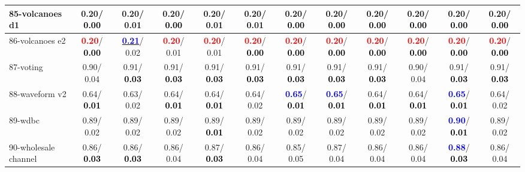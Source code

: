 \begin{table}[h]
\begin{center}
{\begin{tabular}{lc|c|c|c|c|c|c|c|c|c|c}
85-volcanoes d1 &   0.20/\textcolor{black}{\textbf{  0.00}} &   0.20/  0.01 &   0.20/\textcolor{black}{\textbf{  0.00}} &   0.20/  0.01 &   0.20/  0.01 &   0.20/\textcolor{black}{\textbf{  0.00}} &   0.20/\textcolor{black}{\textbf{  0.00}} &   0.20/\textcolor{black}{\textbf{  0.00}} &   0.20/\textcolor{black}{\textbf{  0.00}} &   0.20/\textcolor{black}{\textbf{  0.00}} &   0.20/\textcolor{black}{\textbf{  0.00}} \\ \hline
86-volcanoes e2 & \textcolor{red}{\textbf{  0.20}}/\textcolor{black}{\textbf{  0.00}} & \underline{\textcolor{blue}{\textbf{  0.21}}}/  0.02 & \textcolor{red}{\textbf{  0.20}}/  0.01 & \textcolor{red}{\textbf{  0.20}}/  0.01 & \textcolor{red}{\textbf{  0.20}}/\textcolor{black}{\textbf{  0.00}} & \textcolor{red}{\textbf{  0.20}}/\textcolor{black}{\textbf{  0.00}} & \textcolor{red}{\textbf{  0.20}}/\textcolor{black}{\textbf{  0.00}} & \textcolor{red}{\textbf{  0.20}}/\textcolor{black}{\textbf{  0.00}} & \textcolor{red}{\textbf{  0.20}}/\textcolor{black}{\textbf{  0.00}} & \textcolor{red}{\textbf{  0.20}}/\textcolor{black}{\textbf{  0.00}} & \textcolor{red}{\textbf{  0.20}}/\textcolor{black}{\textbf{  0.00}} \\
87-voting &   0.90/  0.04 &   0.91/\textcolor{black}{\textbf{  0.03}} &   0.91/\textcolor{black}{\textbf{  0.03}} &   0.91/\textcolor{black}{\textbf{  0.03}} &   0.91/\textcolor{black}{\textbf{  0.03}} &   0.91/\textcolor{black}{\textbf{  0.03}} &   0.91/\textcolor{black}{\textbf{  0.03}} &   0.91/\textcolor{black}{\textbf{  0.03}} &   0.90/  0.04 &   0.91/\textcolor{black}{\textbf{  0.03}} &   0.91/\textcolor{black}{\textbf{  0.03}} \\
88-waveform v2 &   0.64/\textcolor{black}{\textbf{  0.01}} &   0.63/  0.02 &   0.64/\textcolor{black}{\textbf{  0.01}} &   0.64/\textcolor{black}{\textbf{  0.01}} &   0.64/  0.02 & \textcolor{blue}{\textbf{  0.65}}/\textcolor{black}{\textbf{  0.01}} & \textcolor{blue}{\textbf{  0.65}}/\textcolor{black}{\textbf{  0.01}} &   0.64/\textcolor{black}{\textbf{  0.01}} &   0.64/\textcolor{black}{\textbf{  0.01}} & \textcolor{blue}{\textbf{  0.65}}/\textcolor{black}{\textbf{  0.01}} &   0.64/  0.02 \\
89-wdbc &   0.89/  0.02 &   0.89/  0.02 &   0.89/  0.02 &   0.89/\textcolor{black}{\textbf{  0.01}} &   0.89/  0.02 &   0.89/  0.02 &   0.89/  0.02 &   0.89/  0.02 &   0.89/  0.02 & \textcolor{blue}{\textbf{  0.90}}/\textcolor{black}{\textbf{  0.01}} &   0.89/  0.02 \\
90-wholesale channel &   0.86/\textcolor{black}{\textbf{  0.03}} &   0.86/\textcolor{black}{\textbf{  0.03}} &   0.86/  0.04 &   0.87/\textcolor{black}{\textbf{  0.03}} &   0.86/  0.04 &   0.85/  0.05 &   0.87/  0.04 &   0.86/  0.04 &   0.86/  0.04 & \textcolor{blue}{\textbf{  0.88}}/\textcolor{black}{\textbf{  0.03}} &   0.86/  0.04 \\

\end{tabular}}
\end{center}
\end{table}
